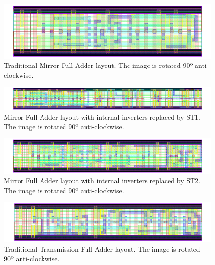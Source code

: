 \documentclass[diss,pgmicro,english]{iiufrgs}
\begin{document}
\begin{figure}[]
\centering
\includegraphics[width=1.5\textwidth, angle =90]{CMOS.png}
\caption{Traditional Mirror Full Adder layout. The image is rotated 90º anti-clockwise.}
\label{fig:CMOS}
\end{figure}

\newpage
\begin{figure}[]
\centering
\includegraphics[width=1.5\textwidth, angle =90]{CMOSST1.png}
\caption{Mirror Full Adder layout with internal inverters replaced by ST1. The image is rotated 90º anti-clockwise.}
\label{fig:CMOSST1}
\end{figure}

\newpage
\begin{figure}[]
\centering
\includegraphics[width=1.5\textwidth, angle =90]{CMOSST2.png}
\caption{Mirror Full Adder layout with internal inverters replaced by ST2. The image is rotated 90º anti-clockwise.}
\label{fig:CMOSST2}
\end{figure}





\newpage
\begin{figure}[]
\centering
\includegraphics[width=1.5\textwidth, angle =90]{TFA.png}
\caption{Traditional Transmission Full Adder layout. The image is rotated 90º anti-clockwise.}
\label{fig:TFA}
\end{figure}
\end{document}
